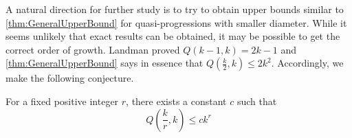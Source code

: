 A natural direction for further study is to try to obtain upper bounds similar to \autoref{thm:GeneralUpperBound} for quasi-progressions with smaller diameter. While it seems unlikely that exact results can be obtained, it may be possible to get the correct order of growth. Landman proved $Q\left(k-1,k\right) = 2k-1$ and \autoref{thm:GeneralUpperBound} says in essence that $Q\left(\frac{k}{2},k\right) \leq 2k^2$. Accordingly, we make the following conjecture.

\begin{conjecture}For a fixed positive integer $r$, there exists a constant $c$ such that \[Q\left(\frac{k}{r},k\right) \leq c k^r\]
\end{conjecture}
